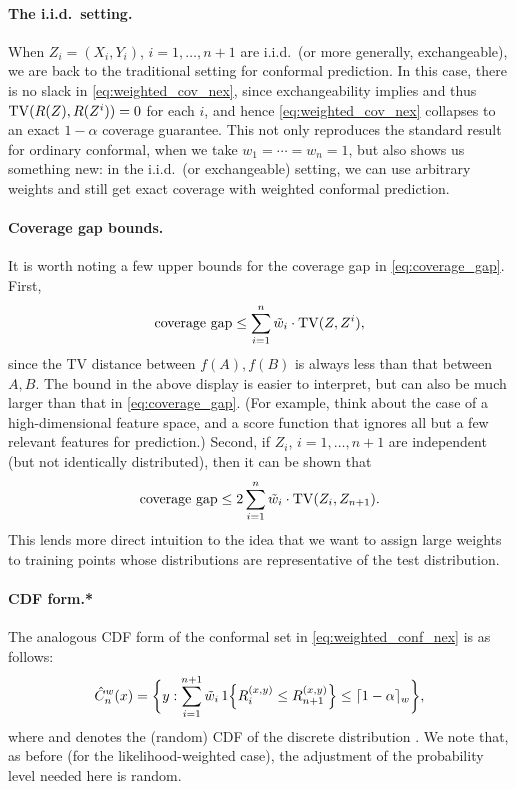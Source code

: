 \documentclass{article}
\begin{document}
\paragraph{The i.i.d.\ setting.}

When $Z_i=(X_i,Y_i)$, $i=1,\dots,n+1$ are i.i.d.\ (or more generally,
exchangeable), we are back to the traditional setting for conformal
prediction. In this case, there is no slack in \eqref{eq:weighted_cov_nex},
since exchangeability implies  and thus
$\mathrm{TV}(R(Z), R(Z^i)) = 0$ for each $i$, and hence \eqref{eq:weighted_cov_nex}
collapses to an exact $1-\alpha$ coverage guarantee. This not only reproduces
the standard result for ordinary conformal, when we take $w_1 = \cdots = w_n =
1$, but also shows us something new: in the i.i.d.\ (or exchangeable) setting,
we can use arbitrary weights and still get exact coverage with weighted
conformal prediction. 

\paragraph{Coverage gap bounds.}

It is worth noting a few upper bounds for the coverage gap in
\eqref{eq:coverage_gap}. First, 
\[
\text{coverage gap} \leq \sum_{i=1}^n \tilde{w}_i \cdot \mathrm{TV}(Z, Z^i),
\]
since the TV distance between $f(A),f(B)$ is always less than that between
$A,B$. The bound in the above display is easier to interpret, but can also be
much larger than that in \eqref{eq:coverage_gap}. (For example, think about the
case of a high-dimensional feature space, and a score function that ignores all
but a few relevant features for prediction.) Second, if $Z_i$, $i=1,\dots,n+1$
are independent (but not identically distributed), then it can be shown that 
\[
\text{coverage gap} \leq 2\sum_{i=1}^n \tilde{w}_i \cdot \mathrm{TV}(Z_i, Z_{n+1}).
\]
This lends more direct intuition to the idea that we want to assign large
weights to training points whose distributions are representative of the test 
distribution. 

\paragraph{CDF form.*}

The analogous CDF form of the conformal set in \eqref{eq:weighted_conf_nex} is
as follows: 
\begin{equation}
\label{eq:weighted_cdf_nex}
\hat{C}^w_n(x) = \bigg\{ y : \sum_{i=1}^{n+1} \tilde{w}_i \, 1\Big\{ R_i^{(x,y)} \leq
R^{(x,y)}_{n+1} \Big\} \leq \lceil 1-\alpha \rceil_w \bigg\},
\end{equation}
where  and  denotes the (random) CDF of the
discrete distribution . We note that, as before (for the
likelihood-weighted case), the adjustment of the probability level needed here
is random.  
\end{document}
